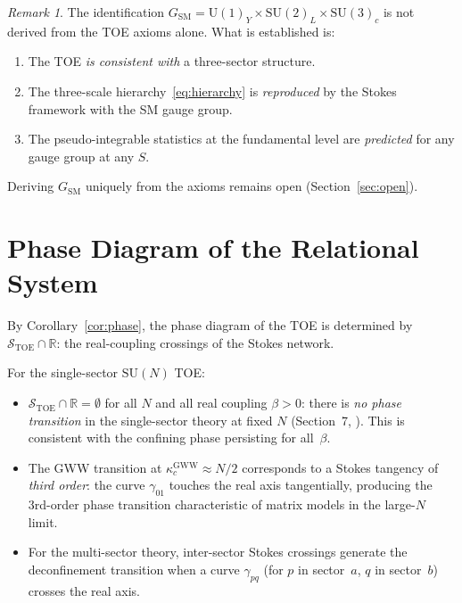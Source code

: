 \documentclass[12pt]{article}
\theoremstyle{definition}
\theoremstyle{remark}
\newtheorem{remark}[theorem]{Remark}
\newcommand{\SU}{\mathrm{SU}}
\newcommand{\U}{\mathrm{U}}
\newcommand{\TOE}{\mathrm{TOE}}
\newcommand{\SM}{\mathrm{SM}}
\begin{document}
\begin{remark}
The identification $G_\SM = \U(1)_Y \times \SU(2)_L \times \SU(3)_c$
is not derived from the TOE axioms alone.  What is established is:
\begin{enumerate}
\item[(a)] The TOE \emph{is consistent with} a three-sector structure.
\item[(b)] The three-scale hierarchy~\eqref{eq:hierarchy} is
  \emph{reproduced} by the Stokes framework with the SM gauge group.
\item[(c)] The pseudo-integrable statistics at the fundamental level
  are \emph{predicted} for any gauge group at any $S$.
\end{enumerate}
Deriving $G_\SM$ uniquely from the axioms remains open (Section~\ref{sec:open}).
\end{remark}

\section{Phase Diagram of the Relational System}
\label{sec:phase}

By Corollary~\ref{cor:phase}, the phase diagram of the TOE is
determined by $\mathcal{S}_\TOE \cap \mathbb{R}$: the real-coupling
crossings of the Stokes network.

For the single-sector $\SU(N)$ TOE:
\begin{itemize}
\item $\mathcal{S}_\TOE \cap \mathbb{R} = \emptyset$ for all $N$ and
  all real coupling $\beta > 0$: there is \emph{no phase transition}
  in the single-sector theory at fixed $N$ (Section~7, \cite{OlbrykPsi2026}).
  This is consistent with the confining phase persisting for all~$\beta$.
\item The GWW transition at $\kappa_c^{\mathrm{GWW}} \approx N/2$
  corresponds to a Stokes tangency of \emph{third order}: the curve
  $\gamma_{01}$ touches the real axis tangentially, producing the
  3rd-order phase transition characteristic of matrix models in the
  large-$N$ limit.
\item For the multi-sector theory, inter-sector Stokes crossings
  generate the deconfinement transition when a curve $\gamma_{pq}$
  (for $p$ in sector~$a$, $q$ in sector~$b$) crosses the real axis.
\end{itemize}
\end{document}

